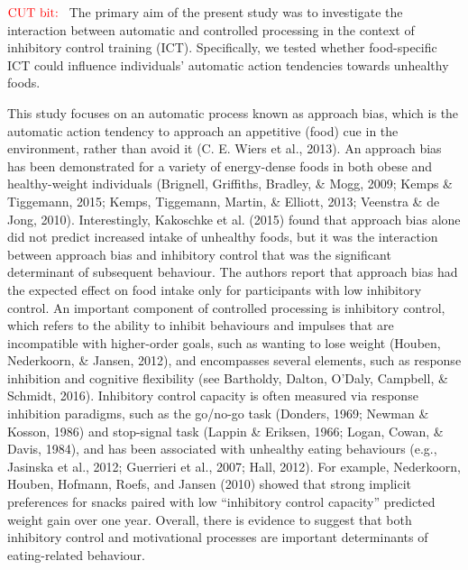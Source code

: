 \documentclass[man]{apa6}
\begin{document}
\(\color{red}\text{{CUT bit:  }}\)
The primary aim of the present study was to investigate the interaction between automatic and controlled processing in the context of inhibitory control training (ICT). Specifically, we tested whether food-specific ICT could influence individuals' automatic action tendencies towards unhealthy foods.

\par

This study focuses on an automatic process known as approach bias, which is the automatic action tendency to approach an appetitive (food) cue in the environment, rather than avoid it (C. E. Wiers et al., 2013). An approach bias has been demonstrated for a variety of energy-dense foods in both obese and healthy-weight individuals (Brignell, Griffiths, Bradley, \& Mogg, 2009; Kemps \& Tiggemann, 2015; Kemps, Tiggemann, Martin, \& Elliott, 2013; Veenstra \& de Jong, 2010). Interestingly, Kakoschke et al. (2015) found that approach bias alone did not predict increased intake of unhealthy foods, but it was the interaction between approach bias and inhibitory control that was the significant determinant of subsequent behaviour. The authors report that approach bias had the expected effect on food intake only for participants with low inhibitory control. An important component of controlled processing is inhibitory control, which refers to the ability to inhibit behaviours and impulses that are incompatible with higher-order goals, such as wanting to lose weight (Houben, Nederkoorn, \& Jansen, 2012), and encompasses several elements, such as response inhibition and cognitive flexibility (see Bartholdy, Dalton, O'Daly, Campbell, \& Schmidt, 2016). Inhibitory control capacity is often measured via response inhibition paradigms, such as the go/no-go task (Donders, 1969; Newman \& Kosson, 1986) and stop-signal task (Lappin \& Eriksen, 1966; Logan, Cowan, \& Davis, 1984), and has been associated with unhealthy eating behaviours (e.g., Jasinska et al., 2012; Guerrieri et al., 2007; Hall, 2012). For example, Nederkoorn, Houben, Hofmann, Roefs, and Jansen (2010) showed that strong implicit preferences for snacks paired with low \enquote{inhibitory control capacity} predicted weight gain over one year. Overall, there is evidence to suggest that both inhibitory control and motivational processes are important determinants of eating-related behaviour.

\par
\end{document}
